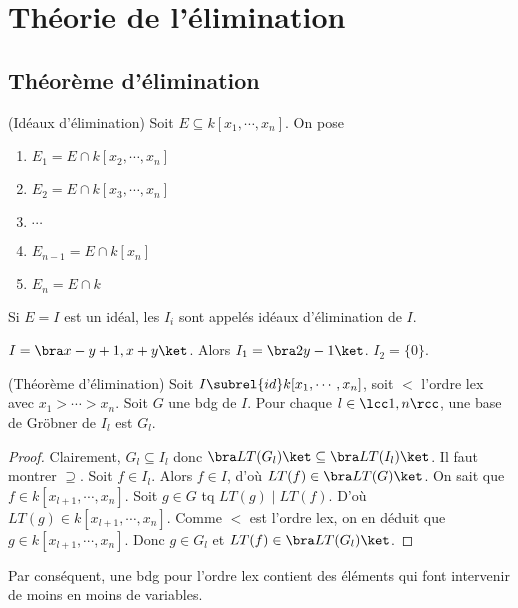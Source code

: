 \chapter{Théorie de l'élimination}
    \section{Théorème d'élimination}
        \begin{defi} (Idéaux d'élimination)
            Soit $E \subseteq k[x_1, \cdots, x_n]$. On pose
            \begin{enumerate}
                \item $E_1 = E \cap k[x_2, \cdots, x_n]$
                \item $E_2 = E \cap k[x_3, \cdots, x_n]$
                \item $\cdots$
                \item $E_{n-1} = E \cap k[x_n]$
                \item $E_n = E \cap k$
            \end{enumerate}
            Si $E = I$ est un idéal, les $I_i$ sont appelés idéaux d'élimination de $I$.
        \end{defi}
        \begin{expl}
            $I = \bra x-y+1, x+y \ket$. Alors $I_1 = \bra 2y - 1 \ket$. $I_2 = \{0\}$.
        \end{expl}
        \begin{theo} (Théorème d'élimination)
            Soit $I \subrel{id} k[x_1, \cdots, x_n]$, soit $<$ l'ordre lex avec $x_1 > \cdots > x_n$. Soit $G$ une bdg de $I$. Pour chaque $l \in \lcc 1,n \rcc$, une base de Gröbner de $I_l$ est $G_l$.
        \end{theo}
        \begin{proof}
            Clairement, $G_l \subseteq I_l$ donc $\bra LT(G_l) \ket \subseteq \bra LT(I_l) \ket$. Il faut montrer $\supseteq$. Soit $f \in I_l$. Alors $f \in I$, d'où $LT(f) \in \bra LT(G) \ket$. On sait que $f \in k[x_{l+1}, \cdots, x_n]$. Soit $g \in G$ tq $LT(g) \mid LT(f)$. D'où $LT(g) \in k[x_{l+1}, \cdots, x_n]$. Comme $<$ est l'ordre lex, on en déduit que $g \in k[x_{l+1}, \cdots, x_n]$. Donc $g \in G_l$ et $LT(f) \in \bra LT(G_l) \ket$.
        \end{proof}
        Par conséquent, une bdg pour l'ordre lex contient des éléments qui font intervenir de moins en moins de variables.

